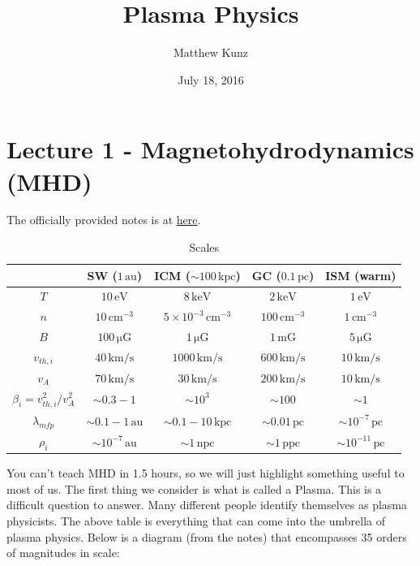 \documentclass[letterpaper, 11pt]{article}
\numberwithin{equation}{section}
\numberwithin{figure}{section}
\begin{document}
\title{Plasma Physics}
\author{Matthew Kunz}
\date{July 18, 2016}

\maketitle

\section{Lecture 1 - Magnetohydrodynamics (MHD)}
\label{sec:lec1}

The officially provided notes is at \href{https://pitp.ias.edu/sites/pitp/files/kunz_1.pdf}{here}.

\begin{table}[h]
  \centering
  \begin{tabular}{|c|c|c|c|c|}
    \hline
    & SW ($1\,\mathrm{au}$) & ICM  ($\sim 100\,\mathrm{kpc}$) & GC ($0.1\,\mathrm{pc}$) & ISM (warm) \\ \hline
    $T$ & $10\,\mathrm{eV}$ & $8\,\mathrm{keV}$ & $2\,\mathrm{keV}$ & $1\,\mathrm{eV}$ \\ \hline
    $n$ & $10\,\mathrm{cm^{-3}}$& $5\times 10^{-3}\,\mathrm{cm^{-3}}$& $100\,\mathrm{cm^{-3}}$ & $1\,\mathrm{cm^{-3}}$ \\ \hline
    $B$ & $100\,\mathrm{\mu G}$ & $1\,\mathrm{\mu G}$ & $1\,\mathrm{mG}$ & $5\,\mathrm{\mu G}$ \\ \hline
    $v_{th,i}$ & $40\,\mathrm{km/s}$ & $1000\,\mathrm{km/s}$ & $600\,\mathrm{km/s}$ &  $10\,\mathrm{km/s}$ \\ \hline
    $v_{A}$ & $70\,\mathrm{km/s}$ & $30\,\mathrm{km/s}$ & $200\,\mathrm{km/s}$ & $10\,\mathrm{km/s}$ \\ \hline
    $\beta_i = v_{th,i}^2/v_A^2$ & $\sim 0.3-1$ & $\sim 10^3$ & $\sim 100$ & $\sim 1$ \\ \hline
    $\lambda_{mfp}$ & $\sim 0.1 - 1\,\mathrm{au}$ & $\sim 0.1 - 10\,\mathrm{kpc}$ & $\sim 0.01\,\mathrm{pc}$& $\sim 10^{-7}\,\mathrm{pc}$ \\ \hline
    $\rho_i$ & $\sim 10^{-7}\,\mathrm{au}$ & $\sim 1\,\mathrm{npc}$ & $\sim 1\,\mathrm{ppc}$ & $\sim 10^{-11}\,\mathrm{pc}$ \\ \hline
  \end{tabular}
  \caption{Scales}
  \label{tab:scales}
\end{table}

You can't teach MHD in 1.5 hours, so we will just highlight something useful to
most of us. The first thing we consider is what is called a Plasma. This is a
difficult question to answer. Many different people identify themselves as
plasma physicists. The above table is everything that can come into the umbrella
of plasma physics. Below is a diagram (from the notes) that encompasses 35
orders of magnitudes in scale:
\end{document}
